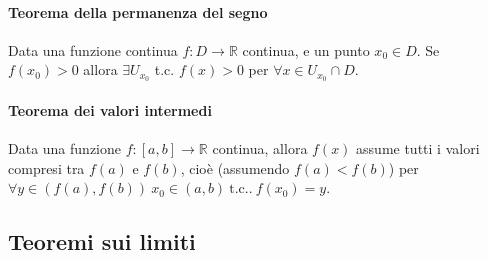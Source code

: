 \documentclass[letterpaper,10pt,english]{jupyterBook}
\begin{document}
\paragraph{Teorema della permanenza del segno}
\label{\detokenize{ch/infinitesimal_calculus/analysis:teorema-della-permanenza-del-segno}}\label{\detokenize{ch/infinitesimal_calculus/analysis:infinitesimal-calculus-continuous-fun-thms-sign}}
\sphinxAtStartPar
Data una funzione continua \(f: D \rightarrow \mathbb{R}\) continua, e un punto \(x_0 \in D\). Se \(f(x_0) > 0\) allora \(\exists U_{x_0}\) t.c. \(f(x) > 0\) per \(\forall x \in U_{x_0} \cap D\).

\sphinxAtStartPar
{} 


\paragraph{Teorema dei valori intermedi}
\label{\detokenize{ch/infinitesimal_calculus/analysis:teorema-dei-valori-intermedi}}\label{\detokenize{ch/infinitesimal_calculus/analysis:infinitesimal-calculus-continuous-fun-thms-intermediate}}
\sphinxAtStartPar
Data una funzione \(f: [a,b] \rightarrow \mathbb{R}\) continua, allora \(f(x)\) assume tutti i valori compresi tra \(f(a)\) e \(f(b)\), cioè (assumendo \(f(a) < f(b)\)) per \(\forall y \in (f(a), f(b)) \ x_0 \in (a,b) \ \text{t.c..} \ f(x_0) = y\).

\sphinxAtStartPar
{} 


\subsection{Teoremi sui limiti}
\label{\detokenize{ch/infinitesimal_calculus/analysis:teoremi-sui-limiti}}\label{\detokenize{ch/infinitesimal_calculus/analysis:infinitesimal-calculus-limits-thms}}
\end{document}
